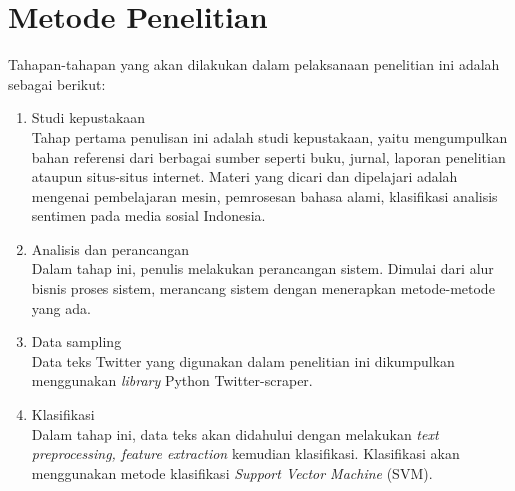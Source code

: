 \section{Metode Penelitian}
Tahapan-tahapan yang akan dilakukan dalam pelaksanaan penelitian ini adalah sebagai berikut:
\begin{enumerate}[nolistsep,leftmargin=0.5cm]
\item Studi kepustakaan\\
Tahap pertama penulisan ini adalah studi kepustakaan, yaitu mengumpulkan 
bahan referensi dari berbagai sumber seperti buku, jurnal, laporan 
penelitian ataupun situs-situs internet. Materi yang dicari dan 
dipelajari adalah mengenai pembelajaran mesin, pemrosesan bahasa alami, 
klasifikasi analisis sentimen pada media sosial Indonesia.
\item Analisis dan perancangan\\
Dalam tahap ini, penulis melakukan perancangan sistem. Dimulai dari alur 
bisnis proses sistem, merancang sistem dengan menerapkan metode-metode 
yang ada.
\item Data sampling\\
Data teks Twitter yang digunakan dalam penelitian ini dikumpulkan 
menggunakan \textit{library} Python Twitter-scraper.
\item Klasifikasi\\
Dalam tahap ini, data teks akan didahului dengan melakukan \textit{text preprocessing, feature extraction} kemudian klasifikasi. Klasifikasi akan menggunakan metode klasifikasi \textit{Support Vector Machine} (SVM).
\end{enumerate}

